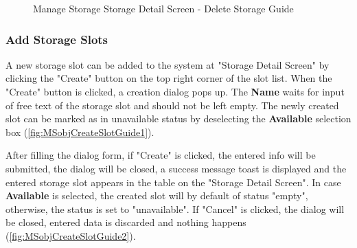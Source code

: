 \begin{figure}[H]
	\centering

    \caption{Manage Storage Storage Detail Screen - Delete Storage Guide}
	\label{fig:MSobjDeleteGuide}
\end{figure}


\subsubsection{Add Storage Slots}
\label{subsubsec:addSlot}

A new storage slot can be added to the system at "Storage Detail Screen" by clicking the "Create" button on the top right corner of the slot list.
When the "Create" button is clicked, a creation dialog pops up. The \textbf{Name} waits for input of free text of the storage slot and should not be left empty. The newly created slot can be marked as in unavailable status by deselecting the \textbf{Available} selection box (\autoref{fig:MSobjCreateSlotGuide1}).

After filling the dialog form, if "Create" is clicked, the entered info will be submitted, the dialog will be closed, a success message toast is displayed and the entered storage slot appears in the table on the "Storage Detail Screen". In case \textbf{Available} is selected, the created slot will by default of status "empty", otherwise, the status is set to "unavailable". If "Cancel" is clicked, the dialog will be closed, entered data is discarded and nothing happens (\autoref{fig:MSobjCreateSlotGuide2}).

